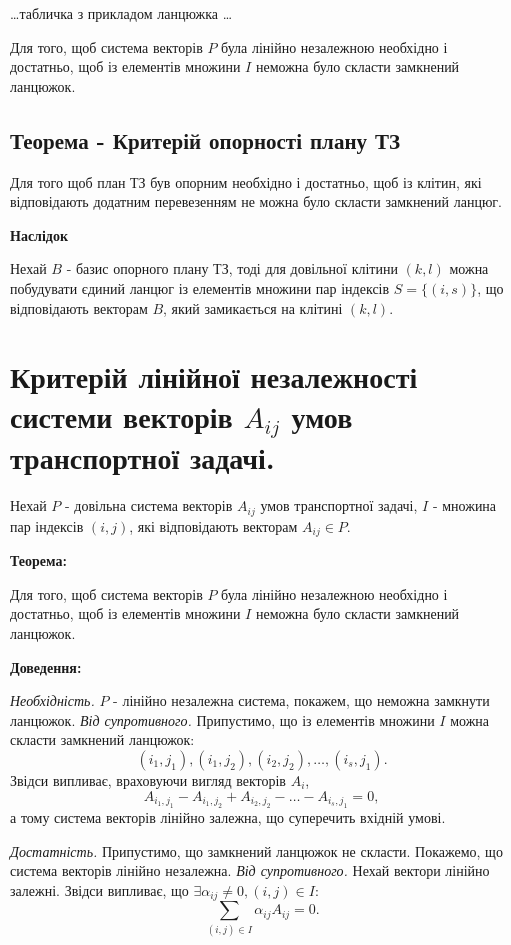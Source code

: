 \documentclass[12pt,a4paper]{article}
\begin{document}
\dots табличка з прикладом ланцюжка \dots

Для того, щоб система векторів $P$ була лінійно незалежною необхідно і достатньо, щоб із елементів множини $I$ неможна було скласти замкнений ланцюжок.\\

\subsection{Теорема - Критерій опорності плану ТЗ}

Для того щоб план ТЗ був опорним необхідно і достатньо, щоб із клітин, які відповідають додатним перевезенням не можна було скласти замкнений ланцюг.

{\bf Наслідок}

Нехай $B$ - базис опорного плану ТЗ, тоді для довільної клітини $(k,l)$ можна побудувати єдиний ланцюг із елементів множини пар індексів $S=\{(i,s)\}$, що відповідають векторам $B$, який замикається на клітині $(k,l)$.

\clearpage

\section{Критерій лінійної незалежності системи векторів $A_{ij}$ умов транспортної задачі.}

Нехай $P$ - довільна система векторів $A_{ij}$ умов транспортної задачі, $I$ - множина пар індексів $(i,j)$, які відповідають векторам $A_{ij} \in P$.

{\bf Теорема:}

Для того, щоб система векторів $P$ була лінійно незалежною необхідно і достатньо, щоб із елементів множини $I$ неможна було скласти замкнений ланцюжок.

{\bf Доведення:}

{\it Необхідність.} $P$ - лінійно незалежна система, покажем, що неможна замкнути ланцюжок. {\it Від супротивного.} Припустимо, що із елементів множини $I$ можна скласти замкнений ланцюжок: $$(i_1,j_1), (i_1,j_2), (i_2,j_2), \dots, (i_s,j_1).$$ Звідси випливає, враховуючи вигляд векторів $A_i$, $$A_{{i_1},{j_1}}-A_{{i_1},{j_2}}+A_{{i_2},{j_2}}-\dots-A_{{i_s},{j_1}}=0,$$ а тому система векторів лінійно залежна, що суперечить вхідній умові.

{\it Достатність.} Припустимо, що замкнений ланцюжок не скласти. Покажемо, що система векторів лінійно незалежна. {\it Від супротивного.} Нехай вектори лінійно залежні. Звідси випливає, що $\exists \alpha_{ij} \neq 0, (i,j) \in I:$ $$\sum_{(i,j) \in I}\alpha_{ij}A_{ij} = 0.$$
\end{document}
